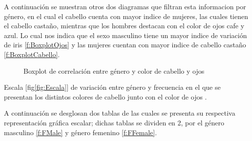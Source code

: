 \documentclass[12pt,a4paper]{article}
\begin{document}
A continuación se muestran otros dos diagramas que filtran esta informacion por género, en el cual el cabello cuenta con mayor indice de mujeres, las cuales tienen el cabello castaño, mientras que los hombres destacan con el color de ojos cafe y azul. 
Lo cual nos indica que el sexo masculino tiene un mayor indice de variación de iris \ref{f:BoxplotOjos} y las mujeres cuentan con mayor indice de cabello castaño \ref{f:BoxplotCabello}.

\begin{figure}[ht]
 \centering
 \caption{Boxplot de correlación entre género y color de cabello y ojos}
 \label{f:Boxplot}
\end{figure}


\newpage
Escala [fig\ref{fig:Escala}] de variación entre género y frecuencia en el que se presentan los distintos colores de cabello junto con el color de ojos \citep{RChart}.

A continuación se desglosan dos tablas de las cuales se presenta su respectiva representación gráfica escalar; dichas tablas se dividen en 2, por el género masculino \ref{f:FMale} y género femenino \ref{f:FFemale}.
\end{document}
